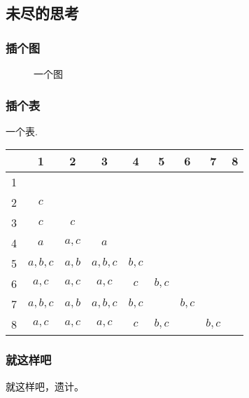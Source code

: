 \documentclass[notheorems,mathserif,table]{beamer}
\begin{document}
\begin{CJK*}{GBK}{kai}
\section{未尽的思考}
\begin{frame}\frametitle{插个图}
\begin{figure}[!htbp]
\centering
\caption{一个图}
\end{figure}
\end{frame}

\begin{frame}\frametitle{插个表}
一个表.
 \begin{table}
  \centering \addtolength{\tabcolsep}{1mm}
 \begin{tabular}{ccccccccc}
   \hline
        & 1 & 2 & 3 & 4 & 5 & 6 & 7 & 8 \\
   \hline
   1 &         &       &          &       &       &       &       &  \\
   2 & $c$     &       &          &       &       &       &       &  \\
   3 & $c$     & $c $  &          &       &       &       &       &  \\
   4 & $a$     & $a,c$ & $a $     &       &       &       &       &  \\
   5 & $a,b,c$ & $a,b$ & $a,b,c$  & $b,c$ &       &       &       &  \\
   6 & $a,c$   & $a,c$ & $a,c$    & $c $  & $b,c$ &       &       &  \\
   7 & $a,b,c$ & $a,b$ & $a,b,c$  & $b,c$ &       & $b,c$ &       &  \\
   8 & $a,c$   & $a,c$ & $a,c$    & $c$   & $b,c$ &       & $b,c$ &  \\
   \hline
 \end{tabular}\label{dismatrix}
 \end{table}
\end{frame}
\begin{frame}\frametitle{就这样吧}
就这样吧，遗计。
\end{frame}

\end{CJK*}
\end{document}
